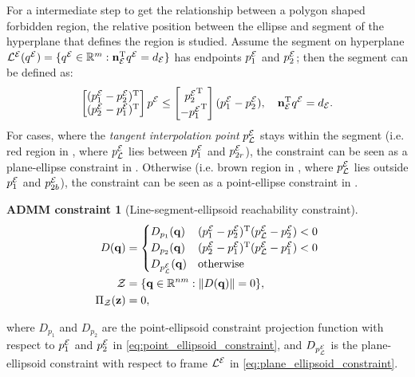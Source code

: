 \documentclass[10pt,twocolumn,twoside]{IEEEtran}
\newtheorem{constraint}{ADMM constraint}
\def\sZ{\mathcal{Z}}
\begin{document}
For a intermediate step to get the relationship between a polygon shaped forbidden region, the relative position between the ellipse and segment of the hyperplane that defines the region is studied. 
Assume the segment on hyperplane ${\mathcal{L}^{\mathcal{E}}}({q^{\mathcal{E}}}) = \{ {q^{\mathcal{E}}}\in\mathbb{R}^m:  \mathbf{n}_{\mathcal{E}}^\mathrm{T} {q^{\mathcal{E}}} = d_{\mathcal{E}}\}$ has endpoints ${p_1^{\mathcal{E}}}$ and ${p_2^{\mathcal{E}}}$; then the segment can be defined as:
\begin{equation}
\begin{bmatrix}({p_1^{\mathcal{E}}}- {p_2^{\mathcal{E}}})^\mathrm{T}\\( {p_2^{\mathcal{E}}} - {p_1^{\mathcal{E}}})^\mathrm{T}\end{bmatrix}  {p^{\mathcal{E}}} \leq \begin{bmatrix} {p_2^{\mathcal{E}}}^\mathrm{T}\\- {p_1^{\mathcal{E}}}^\mathrm{T}\end{bmatrix}( {p_1^{\mathcal{E}}}- {p_2^{\mathcal{E}}}), \quad \mathbf{n}_{\mathcal{E}}^\mathrm{T} {q^{\mathcal{E}}} = d_{\mathcal{E}}.
\end{equation}
For cases, where the \emph{tangent interpolation point} ${p_{\mathcal{L}}^{\mathcal{E}}}$ stays within the segment (i.e. red region in , where ${p_{\mathcal{L}}^{\mathcal{E}}}$ lies between ${p_{1}^{\mathcal{E}}}$ and ${p_{2r}^{\mathcal{E}}}$), the constraint can be seen as a plane-ellipse constraint in . Otherwise (i.e. brown region in , where ${p_{\mathcal{L}}^{\mathcal{E}}}$ lies outside ${p_{1}^{\mathcal{E}}}$ and ${p_{2b}^{\mathcal{E}}}$), the constraint can be seen as a point-ellipse constraint in .

\begin{constraint}[Line-segment-ellipsoid reachability constraint]
\begin{align}
D(\vq) &=  \begin{cases}
D_{p_{1}}(\vq) & (\Eframe{p_1}-\Eframe{p_2})\transpose (\Eframe{p_{\cL}}-\Eframe{p_2})<0\\
D_{p_{2}}(\vq) & (\Eframe{p_2}-\Eframe{p_1})\transpose (\Eframe{p_{\cL}} -\Eframe{p_1})<0\\
D_\Eframe{p_{\cL}}(\vq) & \textrm{otherwise}
\end{cases} \label{eq:segment_ellipsoid_constraint}\\
  \sZ &= \{\vq\in\mathbb{R}^{nm}:\norm{D(\vq)} = 0 \},\\
   \Pi_\sZ(\vz) & = 0, 
\end{align}
\end{constraint}
where $D_{p_{1}}$ and $D_{p_{2}}$ are the point-ellipsoid constraint projection function with respect to ${p_{1}^{\mathcal{E}}}$ and ${p_{2}^{\mathcal{E}}}$ in \eqref{eq:point_ellipsoid_constraint}, and $D_{p_{\mathcal{L}}^{\mathcal{E}}}$ is the plane-ellipsoid constraint with respect to frame ${\mathcal{L}^{\mathcal{E}}}$ in \eqref{eq:plane_ellipsoid_constraint}.
\end{document}
